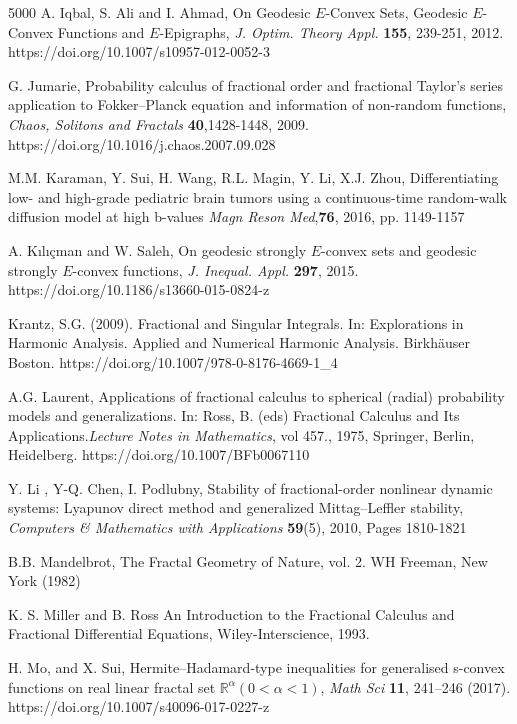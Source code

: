 \documentclass[10pt]{article}
\begin{document}
\begin{thebibliography}{5000}
  A. Iqbal, S. Ali and I. Ahmad, On Geodesic $E$-Convex Sets, Geodesic $E$-Convex Functions and $E$-Epigraphs, {\it J. Optim. Theory Appl.} {\bf 155}, 239-251, 2012. https://doi.org/10.1007/s10957-012-0052-3 

 G. Jumarie, Probability calculus of fractional order and fractional Taylor’s series application to Fokker–Planck equation and information of non-random functions, {\it Chaos, Solitons and Fractals} {\bf40},1428-1448, 2009. https://doi.org/10.1016/j.chaos.2007.09.028

 M.M. Karaman, Y. Sui, H. Wang,  R.L. Magin, Y. Li, X.J. Zhou,
Differentiating low- and high-grade pediatric brain tumors using a continuous-time random-walk diffusion model at high b-values
{\it Magn Reson Med},{\bf 76}, 2016, pp. 1149-1157

 A. K\i l\i\c{c}man and W. Saleh, On geodesic strongly $E$-convex sets and geodesic strongly $E$-convex functions, {\it J. Inequal. Appl.} {\bf297}, 2015. https://doi.org/10.1186/s13660-015-0824-z

 Krantz, S.G. (2009). Fractional and Singular Integrals. In: Explorations in Harmonic Analysis. Applied and Numerical Harmonic Analysis. Birkhäuser Boston. https://doi.org/10.1007/978-0-8176-4669-1\_4

 A.G. Laurent,  Applications of fractional calculus to spherical (radial) probability models and generalizations. In: Ross, B. (eds)  Fractional Calculus and Its Applications.{\it Lecture Notes in Mathematics}, vol 457., 1975, Springer, Berlin, Heidelberg. https://doi.org/10.1007/BFb0067110

Y. Li , Y-Q. Chen, I. Podlubny, Stability of fractional-order nonlinear dynamic systems: Lyapunov direct method and generalized Mittag–Leffler stability, {\it Computers \& Mathematics with Applications}
{\bf59}(5),  2010, Pages 1810-1821

 B.B. Mandelbrot,  The Fractal Geometry of Nature, vol. 2. WH Freeman, New York (1982)

 K. S. Miller and B. Ross An Introduction to the Fractional Calculus
and Fractional Differential Equations, Wiley-Interscience, 1993.


 H. Mo,  and X. Sui, Hermite–Hadamard-type inequalities for generalised s-convex functions on real linear fractal set $\mathbb{R}^\alpha(0<\alpha<1)$, {\it Math Sci} {\bf 11}, 241–246 (2017). https://doi.org/10.1007/s40096-017-0227-z


\end{thebibliography}
\end{document}
